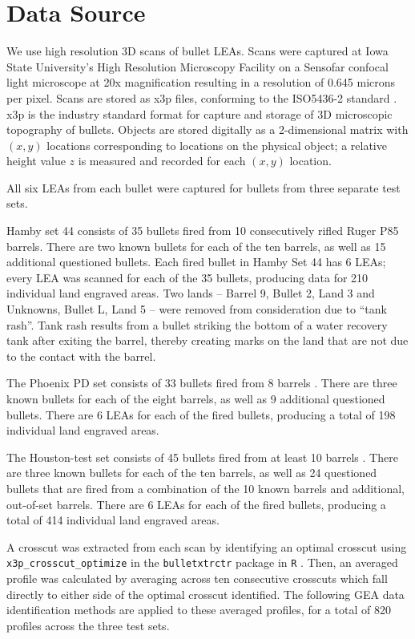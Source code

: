 \documentclass[12pt]{article}
\begin{document}
\section{Data Source}

We use high resolution 3D scans of bullet LEAs. Scans were captured at
Iowa State University's High Resolution Microscopy Facility on a
Sensofar confocal light microscope at 20x magnification resulting in a
resolution of 0.645 microns per pixel. Scans are stored as x3p files,
conforming to the ISO5436-2 standard \citep{ISO5436}. x3p is the
industry standard format for capture and storage of 3D microscopic
topography of bullets. Objects are stored digitally as a 2-dimensional
matrix with \((x,y)\) locations corresponding to locations on the
physical object; a relative height value \(z\) is measured and recorded
for each \((x,y)\) location.

All six LEAs from each bullet were captured for bullets from three
separate test sets.

Hamby set 44 consists of 35 bullets fired from 10 consecutively rifled
Ruger P85 barrels. There are two known bullets for each of the ten
barrels, as well as 15 additional questioned bullets. Each fired bullet
in Hamby Set 44 has 6 LEAs; every LEA was scanned for each of the 35
bullets, producing data for 210 individual land engraved areas. Two
lands -- Barrel 9, Bullet 2, Land 3 and Unknowns, Bullet L, Land 5 --
were removed from consideration due to ``tank rash''. Tank rash results
from a bullet striking the bottom of a water recovery tank after exiting
the barrel, thereby creating marks on the land that are not due to the
contact with the barrel.

The Phoenix PD set consists of 33 bullets fired from 8 barrels
. There are three known
bullets for each of the eight barrels, as well as 9 additional
questioned bullets. There are 6 LEAs for each of the fired bullets,
producing a total of 198 individual land engraved areas.

The Houston-test set consists of 45 bullets fired from at least 10
barrels . There are three
known bullets for each of the ten barrels, as well as 24 questioned
bullets that are fired from a combination of the 10 known barrels and
additional, out-of-set barrels. There are 6 LEAs for each of the fired
bullets, producing a total of 414 individual land engraved areas.

A crosscut was extracted from each scan by identifying an optimal
crosscut using \texttt{x3p\_crosscut\_optimize} in the
\texttt{bulletxtrctr} package in \texttt{R} \cite{bulletxtrctr}. Then,
an averaged profile was calculated by averaging across ten consecutive
crosscuts which fall directly to either side of the optimal crosscut
identified. The following GEA data identification methods are applied to
these averaged profiles, for a total of 820 profiles across the three
test sets.
\end{document}
